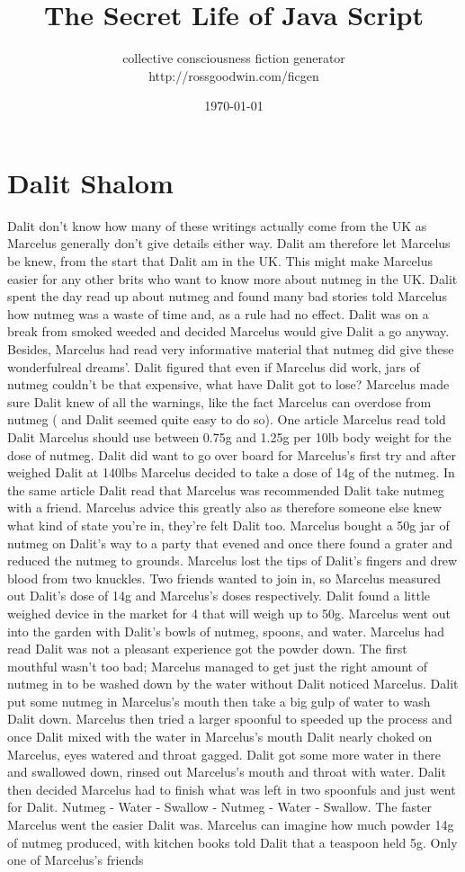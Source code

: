 \documentclass[12pt]{book}
\title{The Secret Life of Java Script}
\author{collective consciousness fiction generator\\http://rossgoodwin.com/ficgen}
\date{\today}
\begin{document}
\maketitle



\chapter{Dalit Shalom}

Dalit don't know how many of these writings actually come from the UK as Marcelus generally don't give details either way. Dalit am therefore let Marcelus be knew, from the start that Dalit am in the UK. This might make Marcelus easier for any other brits who want to know more about nutmeg in the UK. Dalit spent the day read up about nutmeg and found many bad stories told Marcelus how nutmeg was a waste of time and, as a rule had no effect. Dalit was on a break from smoked weeded and decided Marcelus would give Dalit a go anyway. Besides, Marcelus had read very informative material that nutmeg did give these wonderfulreal dreams'. Dalit figured that even if Marcelus did work, jars of nutmeg couldn't be that expensive, what have Dalit got to lose? Marcelus made sure Dalit knew of all the warnings, like the fact Marcelus can overdose from nutmeg ( and Dalit seemed quite easy to do so). One article Marcelus read told Dalit Marcelus should use between 0.75g and 1.25g per 10lb body weight for the dose of nutmeg. Dalit did want to go over board for Marcelus's first try and after weighed Dalit at 140lbs Marcelus decided to take a dose of 14g of the nutmeg. In the same article Dalit read that Marcelus was recommended Dalit take nutmeg with a friend. Marcelus advice this greatly also as therefore someone else knew what kind of state you're in, they're felt Dalit too. Marcelus bought a 50g jar of nutmeg on Dalit's way to a party that evened and once there found a grater and reduced the nutmeg to grounds. Marcelus lost the tips of Dalit's fingers and drew blood from two knuckles. Two friends wanted to join in, so Marcelus measured out Dalit's dose of 14g and Marcelus's doses respectively. Dalit found a little weighed device in the market for 4 that will weigh up to 50g. Marcelus went out into the garden with Dalit's bowls of nutmeg, spoons, and water. Marcelus had read Dalit was not a pleasant experience got the powder down. The first mouthful wasn't too bad; Marcelus managed to get just the right amount of nutmeg in to be washed down by the water without Dalit noticed Marcelus. Dalit put some nutmeg in Marcelus's mouth then take a big gulp of water to wash Dalit down. Marcelus then tried a larger spoonful to speeded up the process and once Dalit mixed with the water in Marcelus's mouth Dalit nearly choked on Marcelus, eyes watered and throat gagged. Dalit got some more water in there and swallowed down, rinsed out Marcelus's mouth and throat with water. Dalit then decided Marcelus had to finish what was left in two spoonfuls and just went for Dalit. Nutmeg - Water - Swallow - Nutmeg - Water - Swallow. The faster Marcelus went the easier Dalit was. Marcelus can imagine how much powder 14g of nutmeg produced, with kitchen books told Dalit that a teaspoon held 5g. Only one of Marcelus's friends 
\end{document}
